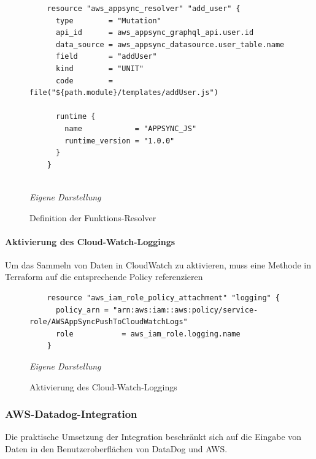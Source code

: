 	\begin{figure}[H]
	\centering
	\begin{minipage}[t]{.7\textwidth} %
	\caption{Definition der Funktions-Resolver} %
	\begin{verbatim}
	resource "aws_appsync_resolver" "add_user" {
	  type        = "Mutation"
	  api_id      = aws_appsync_graphql_api.user.id
	  data_source = aws_appsync_datasource.user_table.name
	  field       = "addUser"
	  kind        = "UNIT"
	  code        = file("${path.module}/templates/addUser.js")
	
	  runtime {
	    name            = "APPSYNC_JS"
	    runtime_version = "1.0.0"
	  }
	}
	
	\end{verbatim}
	
	\textit{Eigene Darstellung} %
	\label{fig:resolverDefinition}
	\end{minipage}
	\end{figure}
\paragraph{Aktivierung des Cloud-Watch-Loggings}
Um das Sammeln von Daten in CloudWatch zu aktivieren, muss eine Methode in Terraform auf die entsprechende Policy referenzieren
\newline
\newline
	\begin{figure}[H]
	\centering
	\begin{minipage}[t]{.7\textwidth} %
	\caption{Aktivierung des Cloud-Watch-Loggings} %
	\begin{verbatim}
	resource "aws_iam_role_policy_attachment" "logging" {
	  policy_arn = "arn:aws:iam::aws:policy/service-role/AWSAppSyncPushToCloudWatchLogs"
	  role           = aws_iam_role.logging.name
	}
	\end{verbatim}
	
	\textit{Eigene Darstellung} %
	\label{fig:loggingAktivierung}
	\end{minipage}
	\end{figure}

\subsubsection{AWS-Datadog-Integration}
Die praktische Umsetzung der Integration beschränkt sich auf die Eingabe von Daten in den Benutzeroberflächen von DataDog und AWS.
